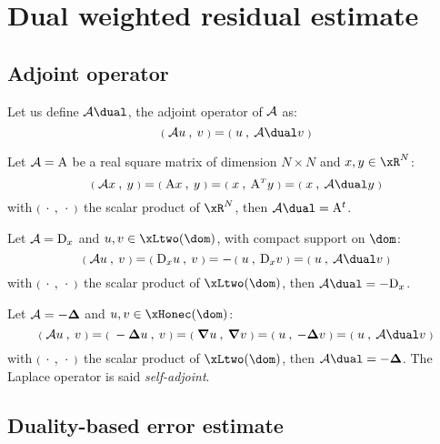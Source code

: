 \section{Dual weighted residual estimate}

\subsection{Adjoint operator}

\begin{dfntn}
Let us define $\opA\dual$, the adjoint operator of $\mathcal{A}$ as:
\begin{equation*}
\Inner{\opA u}{v} = \Inner{u}{\opA\dual v}
\end{equation*}
\end{dfntn}

\begin{xmpl}
Let $\mathcal{A} = {\mathrm A}$ be a real square matrix of dimension $N\times N$ and $x,y \in \xR^N$:
\begin{equation*}
\Inner{\opA x}{y} = \Inner{\matA x}{y} = \Inner{x}{\matA\trans y} = \Inner{x}{\opA\dual y}
\end{equation*}
with ${{\scriptstyle\mathbf{(}}\;\,{\mathbf\cdot}\,\:,\: \,{\mathbf\cdot}\, \;{\scriptstyle\mathbf{)}}}$ the scalar product of $\xR^N$, then $\opA\dual = \matA^t$.
\end{xmpl}

\begin{xmpl}
Let $\mathcal{A} = {\mathrm D}_x $ and $u,v \in \xLtwo(\dom)$, with compact support on $\dom$:
\begin{equation*}
\Inner{\opA u}{v} = \Inner{{\mathrm D}_x u}{v} = -\,\Inner{u}{{\mathrm D}_x v} = \Inner{u}{\opA\dual v}
\end{equation*}
with ${{\scriptstyle\mathbf{(}}\;\,{\mathbf\cdot}\,\:,\: \,{\mathbf\cdot}\, \;{\scriptstyle\mathbf{)}}}$ the scalar product of $\xLtwo(\dom)$, then $\opA\dual = - {\mathrm D}_x$.
\end{xmpl}

\begin{xmpl}
Let $\mathcal{A} = -{\boldsymbol\Delta}$ and $u,v \in \xHonec(\dom)$:
\begin{equation*}
\Inner{\opA u}{v} = \Inner{- \Lap u}{v} = \Inner{\Grad u}{\Grad v} = \Inner{u}{- \Lap v} = \Inner{u}{\opA\dual v}
\end{equation*}
with ${{\scriptstyle\mathbf{(}}\;\,{\mathbf\cdot}\,\:,\: \,{\mathbf\cdot}\, \;{\scriptstyle\mathbf{)}}}$ the scalar product of $\xLtwo(\dom)$, then $\opA\dual = - \Lap$. The Laplace operator is said \textit{self-adjoint}.
\end{xmpl}

\subsection{Duality-based \aposteriori error estimate}

